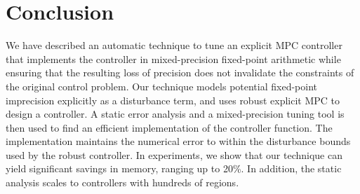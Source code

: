 \section{Conclusion}

We have described an automatic technique to tune an explicit MPC
controller that implements the controller in mixed-precision fixed-point arithmetic
while ensuring that the resulting loss of precision does not invalidate the
constraints of the original control problem.
Our technique models potential fixed-point imprecision explicitly as a disturbance
term, and uses robust explicit MPC to design a controller.
A static error analysis and a mixed-precision tuning tool is then 
used to find an efficient implementation of the controller function.
The implementation maintains the numerical error to within
the disturbance bounds used by the robust controller.
In experiments, we show that our technique can yield significant savings in memory,
ranging up to 20\%. 
In addition, the static analysis scales to controllers with hundreds of regions. 

